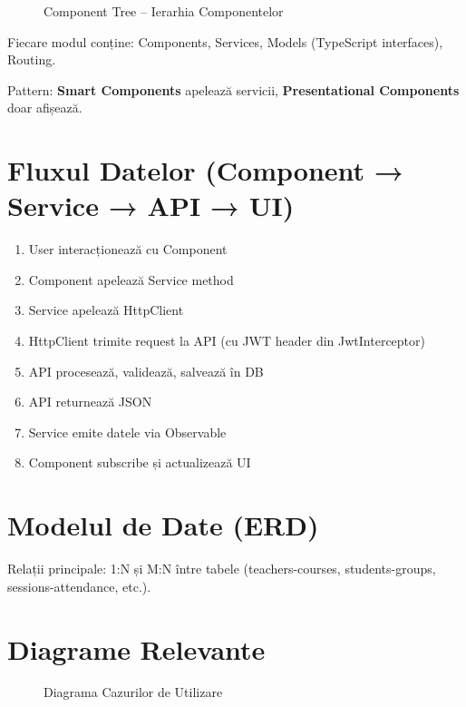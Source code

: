 \begin{figure}[H]
  \centering
  \caption{Component Tree – Ierarhia Componentelor}
  \label{fig:components}
\end{figure}

Fiecare modul conține: Components, Services, Models (TypeScript interfaces), Routing.

Pattern: \textbf{Smart Components} apelează servicii, \textbf{Presentational Components} doar afișează.

\section{Fluxul Datelor (Component → Service → API → UI)}

\begin{enumerate}
  \item User interacționează cu Component
  \item Component apelează Service method
  \item Service apelează HttpClient
  \item HttpClient trimite request la API (cu JWT header din JwtInterceptor)
  \item API procesează, validează, salvează în DB
  \item API returnează JSON
  \item Service emite datele via Observable
  \item Component subscribe și actualizează UI
\end{enumerate}

\section{Modelul de Date (ERD)}


Relații principale: 1:N și M:N între tabele (teachers-courses, students-groups, sessions-attendance, etc.).

\section{Diagrame Relevante}

\begin{figure}[H]
  \centering
  \caption{Diagrama Cazurilor de Utilizare}
  \label{fig:usecases}
\end{figure}